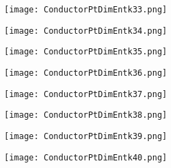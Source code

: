 \documentclass[pdf]{beamer}
\begin{document}
\begin{frame}
\begin{figure}[!h]
\centering
\texttt{[image: ConductorPtDimEntk33.png]}
\end{figure}
\end{frame}

\begin{frame}
\begin{figure}[!h]
\centering
\texttt{[image: ConductorPtDimEntk34.png]}
\end{figure}
\end{frame}

\begin{frame}
\begin{figure}[!h]
\centering
\texttt{[image: ConductorPtDimEntk35.png]}
\end{figure}
\end{frame}

\begin{frame}
\begin{figure}[!h]
\centering
\texttt{[image: ConductorPtDimEntk36.png]}
\end{figure}
\end{frame}

\begin{frame}
\begin{figure}[!h]
\centering
\texttt{[image: ConductorPtDimEntk37.png]}
\end{figure}
\end{frame}

\begin{frame}
\begin{figure}[!h]
\centering
\texttt{[image: ConductorPtDimEntk38.png]}
\end{figure}
\end{frame}

\begin{frame}
\begin{figure}[!h]
\centering
\texttt{[image: ConductorPtDimEntk39.png]}
\end{figure}
\end{frame}

\begin{frame}
\begin{figure}[!h]
\centering
\texttt{[image: ConductorPtDimEntk40.png]}
\end{figure}
\end{frame}
\end{document}
